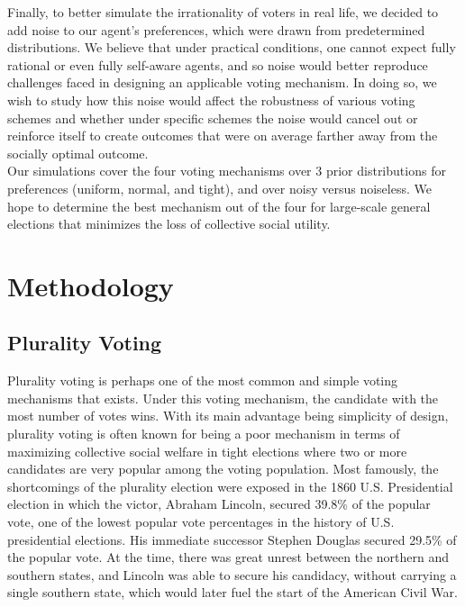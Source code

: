\documentclass[11pt]{scrartcl}
\begin{document}
Finally, to better simulate the irrationality of voters in real life, we decided to add noise to our agent's preferences, which were drawn from predetermined distributions. We believe that under practical conditions, one cannot expect fully rational or even fully self-aware agents, and so noise would better reproduce challenges faced in designing an applicable voting mechanism. In doing so, we wish to study how this noise would affect the robustness of various voting schemes and whether under specific schemes the noise would cancel out or reinforce itself to create outcomes that were on average farther away from the socially optimal outcome.\\

Our simulations cover the four voting mechanisms over 3 prior distributions for preferences (uniform, normal, and tight), and over noisy versus noiseless. We hope to determine the best mechanism out of the four for large-scale general elections that minimizes the loss of collective social utility.

\vspace{2mm}

\section{Methodology}

\subsection{Plurality Voting}

Plurality voting is perhaps one of the most common and simple voting mechanisms that exists. Under this voting mechanism, the candidate with the most number of votes wins. With its main advantage being simplicity of design, plurality voting is often known for being a poor mechanism in terms of maximizing collective social welfare in tight elections where two or more candidates are very popular among the voting population. Most famously, the shortcomings of the plurality election were exposed in the 1860 U.S. Presidential election in which the victor, Abraham Lincoln, secured 39.8\% of the popular vote, one of the lowest popular vote percentages in the history of U.S. presidential elections. His immediate successor Stephen Douglas secured 29.5\% of the popular vote. At the time, there was great unrest between the northern and southern states, and Lincoln was able to secure his candidacy, without carrying a single southern state, which would later fuel the start of the American Civil War.\\
\end{document}
